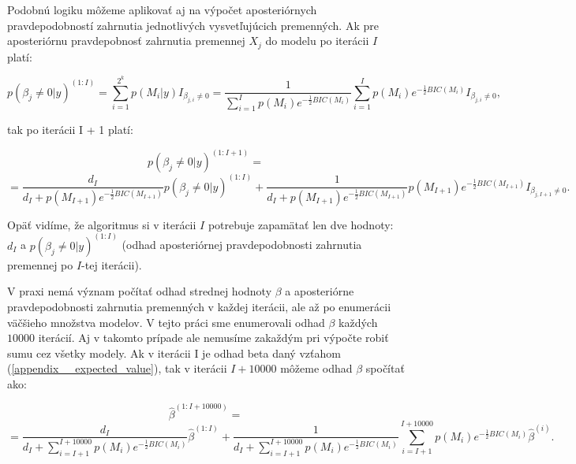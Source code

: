 Podobnú logiku môžeme aplikovať aj na výpočet aposteriórnych pravdepodobností zahrnutia jednotlivých vysvetľujúcich premenných.
Ak pre aposteriórnu pravdepobnosť zahrnutia premennej \(X_j\) do modelu po iterácii \(I\) platí:

\[
    p(\beta_j \neq 0 | y)^{(1:I)} = \sum_{i = 1}^{2^k} p(M_i | y) I_{\beta_{j, i} \neq 0} = \frac{1}{\sum_{i = 1}^{I} p(M_i) e^{-\frac{1}{2}BIC(M_i)}} \sum_{i = 1}^{I} p(M_i) e^{-\frac{1}{2}BIC(M_i)} I_{\beta_{j, i} \neq 0},
\]

tak po iterácii I + 1 platí:

\[
    p(\beta_j \neq 0 | y)^{(1:I + 1)} =
\]
\[
    = \frac{d_I}{d_I + p(M_{I + 1}) e^{-\frac{1}{2}BIC(M_{I + 1})}} p(\beta_j \neq 0 | y)^{(1:I)} + \frac{1}{d_I + p(M_{I + 1}) e^{-\frac{1}{2}BIC(M_{I + 1})}} p(M_{I + 1}) e^{-\frac{1}{2}BIC(M_{I + 1})} I_{\beta_{j, I + 1} \neq 0}.
\]

Opäť vidíme, že algoritmus si v iterácii \(I\) potrebuje zapamätať len dve hodnoty: \(d_I\) a \( p(\beta_j \neq 0 | y)^{(1:I)} \)
(odhad aposteriórnej pravdepodobnosti zahrnutia premennej po \(I\)-tej iterácii).

V praxi nemá význam počítať odhad strednej hodnoty \(\beta\) a aposteriórne pravdepodobnosti zahrnutia premenných v každej iterácii, ale až po enumerácii väčšieho množstva modelov.
V tejto práci sme enumerovali odhad \(\beta\) každých \(10000\) iterácií.
Aj v takomto prípade ale nemusíme zakaždým pri výpočte robiť sumu cez všetky modely.
Ak v iterácii I je odhad beta daný vzťahom (\ref{appendix__expected_value}), tak v iterácii \(I + 10000\) môžeme odhad \(\beta\) spočítať ako:

\[
    \hat{\beta}^{(1:I + 10000)} =
\]
\[
    = \frac{d_I}{d_I + \sum_{i = I + 1}^{I + 10000} p(M_i) e^{-\frac{1}{2}BIC(M_i)}} \hat{\beta}^{(1:I)} + \frac{1}{d_I + \sum_{i = I + 1}^{I + 10000} p(M_i) e^{-\frac{1}{2}BIC(M_i)}} \sum_{i = I + 1}^{I + 10000} p(M_i) e^{-\frac{1}{2}BIC(M_i)} \hat{\beta}^{(i)}.
\]